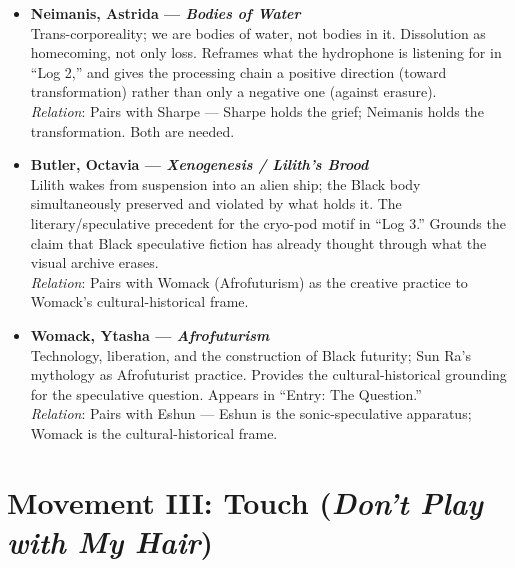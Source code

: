 \begin{itemize}

    \item \textbf{Neimanis, Astrida — \textit{Bodies of Water}} \parencite{Neimanis_2017}\\
    Trans-corporeality; we are bodies of water, not bodies in it. Dissolution as homecoming, not only loss. Reframes what the hydrophone is listening for in ``Log 2,'' and gives the processing chain a positive direction (toward transformation) rather than only a negative one (against erasure).\\
    \textit{Relation}: Pairs with Sharpe — Sharpe holds the grief; Neimanis holds the transformation. Both are needed.

    \item \textbf{Butler, Octavia — \textit{Xenogenesis / Lilith's Brood}} \parencite{Butler_1987}\\
    Lilith wakes from suspension into an alien ship; the Black body simultaneously preserved and violated by what holds it. The literary/speculative precedent for the cryo-pod motif in ``Log 3.'' Grounds the claim that Black speculative fiction has already thought through what the visual archive erases.\\
    \textit{Relation}: Pairs with Womack (Afrofuturism) as the creative practice to Womack's cultural-historical frame.

    \item \textbf{Womack, Ytasha — \textit{Afrofuturism}} \parencite{Womack_2013}\\
    Technology, liberation, and the construction of Black futurity; Sun Ra's mythology as Afrofuturist practice. Provides the cultural-historical grounding for the speculative question. Appears in ``Entry: The Question.''\\
    \textit{Relation}: Pairs with Eshun — Eshun is the sonic-speculative apparatus; Womack is the cultural-historical frame.

\end{itemize}

\bigskip


\section*{Movement III: Touch (\textit{Don't Play with My Hair})}


